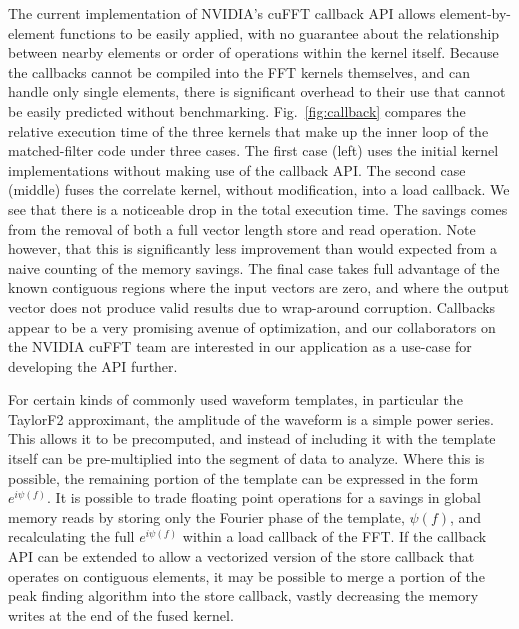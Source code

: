 The current implementation of NVIDIA's cuFFT callback API allows
element-by-element functions to be easily applied, with no guarantee about the
relationship between nearby elements or order of operations within the kernel
itself. Because the callbacks cannot be compiled into the FFT kernels
themselves, and can handle only single elements, there is significant overhead
to their use that cannot be easily predicted without benchmarking.
Fig.~\ref{fig:callback} compares the relative execution time of the three
kernels that make up the inner loop of the matched-filter code under three
cases. The first case (left) uses the initial kernel implementations without
making use of the callback API. The second case (middle) fuses the correlate
kernel, without modification, into a load callback. We see that there is a
noticeable drop in the total execution time. The savings comes from the
removal of both a full vector length store and read operation. Note however,
that this is significantly less improvement than would expected from a naive
counting of the memory savings. The final case takes full advantage of the
known contiguous regions where the input vectors are zero, and where the
output vector does not produce valid results due to wrap-around corruption.
Callbacks appear to be a very promising avenue of optimization, and our
collaborators on the NVIDIA cuFFT team are interested in our application as a
use-case for developing the API further.

For certain kinds of commonly used waveform templates, in particular the
TaylorF2 approximant, the amplitude of the waveform is a simple power series.
This allows it to be precomputed, and instead of including it with the
template itself can be pre-multiplied into the segment of data to analyze.
Where this is possible, the remaining portion of the template can be expressed
in the form $e^{i\psi(f)}$. It is possible to trade floating point operations
for a savings in global memory reads by storing only the Fourier phase of the
template, $\psi(f)$, and recalculating the full $e^{i\psi(f)}$ within a load
callback of the FFT.  If the callback API can be extended to allow a
vectorized version of the store callback that operates on contiguous
elements, it may be possible to merge a portion of the peak finding algorithm
into the store callback, vastly decreasing the memory writes at the end of the
fused kernel.


